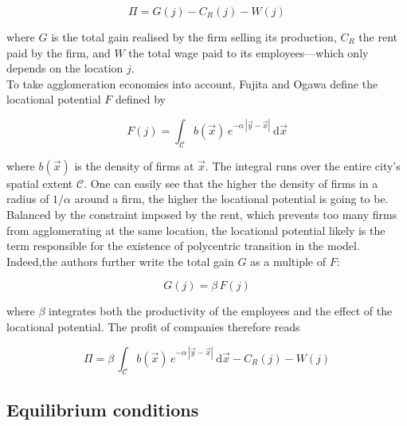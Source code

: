 \begin{equation}
    \Pi = G\left(j\right) 
        - C_R\left(j\right) 
        -  W\left(j\right)
\end{equation}

where $G$ is the total gain realised by the firm selling its production, $C_R$
the rent paid by the firm, and $W$ the total wage paid to its employees---which
only depends on the location $j$.\\

To take agglomeration economies into account, Fujita and Ogawa define the
locational potential $F$ defined by

\begin{equation}
    F\left(j\right) = \int_{\mathcal{C}} b(\vec{x})\,e^{-\alpha\,\left|\vec{y}-\vec{x}\right|}\:\mathrm{d}\vec{x}
\end{equation}

where $b(\vec{x})$ is the density of firms at $\vec{x}$. The integral runs over
the entire city's spatial extent $\mathcal{C}$. One can easily see that the
higher the density of firms in a radius of $1/\alpha$ around a firm, the higher
the locational potential is going to be. Balanced by the constraint imposed by
the rent, which prevents too many firms from agglomerating at the same location,
the locational potential likely is the term responsible for the existence of
polycentric transition in the model. Indeed,the authors further write the total
gain $G$ as a multiple of $F$:

\begin{equation}
    G(j) = \beta\,F(j)
\end{equation}

where $\beta$ integrates both the productivity of the employees and the effect
of the locational potential. The profit
of companies therefore reads

\begin{equation}
    \Pi = \beta\, \int_{\mathcal{C}} b(\vec{x})\,e^{-\alpha\,\left|\vec{y}-\vec{x}\right|}\:\mathrm{d}\vec{x}
        - C_R\left(j\right)
        - W\left(j\right)
\end{equation}


\subsection{Equilibrium conditions}
\label{sub:equilibrium_conditions}

